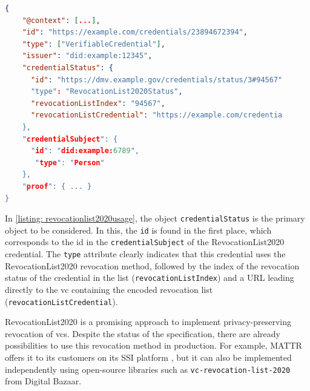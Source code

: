         \begin{lstlisting}[language=json, caption={Example \ac{vc} referencing a RevocationList2020 credential (edited and extracted from \cite{longley_revocation_2021})}, captionpos=b, label={listing: revocationlist2020usage}]  
{
    "@context": [...],
    "id": "https://example.com/credentials/23894672394", 
    "type": ["VerifiableCredential"],
    "issuer": "did:example:12345",
    "credentialStatus": {
      "id": "https://dmv.example.gov/credentials/status/3#94567"
      "type": "RevocationList2020Status",
      "revocationListIndex": "94567",
      "revocationListCredential": "https://example.com/credentia
    }, 
    "credentialSubject": {
      "id": "did:example:6789",
       "type": "Person"
    },
    "proof": { ... } 
}\end{lstlisting}
    
    In \ref{listing: revocationlist2020usage}, the object \texttt{credentialStatus} is the primary object to be considered. In this, the \texttt{id} is found in the first place, which corresponds to the id in the \texttt{credentialSubject} of the RevocationList2020 credential. The \texttt{type} attribute clearly indicates that this credential uses the RevocationList2020 revocation method, followed by the index of the revocation status of the credential in the list (\texttt{revocationListIndex}) and a URL leading directly to the \ac{vc} containing the encoded revocation list (\texttt{revocationListCredential}). \cite{longley_revocation_2021}
    
    RevocationList2020 is a promising approach to implement privacy-preserving revocation of \acp{vc}. Despite the status of the specification, there are already possibilities to use this revocation method in production. For example, MATTR offers it to its customers on its SSI platform \cite{mattr_adding_2020}, but it can also be implemented independently using open-source libraries such as \texttt{vc-revocation-list-2020} \cite{digital_bazaar_vc-revocation-list-2020_2021} from Digital Bazaar.
        
        
        
		